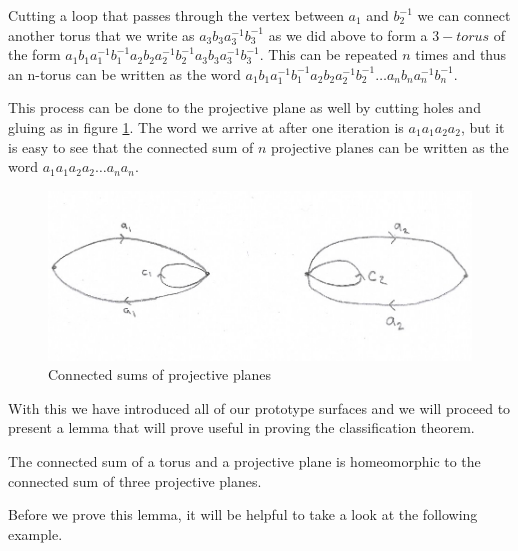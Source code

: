 Cutting a loop that passes through the vertex between $a_1$ and
$b_2^{-1}$ we can connect another torus that we write as
$a_3b_3a_3^{-1}b_3^{-1}$ as we did above to form a $3-torus$ of the
form
$a_1b_1a_1^{-1}b_1^{-1}a_2b_2a_2^{-1}b_2^{-1}a_3b_3a_3^{-1}b_3^{-1}$. This
can be repeated $n$ times and thus an n-torus can be written as the
word $a_1b_1a_1^{-1}b_1^{-1}a_2b_2a_2^{-1}b_2^{-1} \dots
a_nb_na_n^{-1}b_n^{-1}$.

This process can be done to the projective plane as well by cutting
holes and gluing as in figure \ref{fig:2-projective-plane}. The word
we arrive at after one iteration is $a_1a_1a_2a_2$, but it is easy to
see that the connected sum of $n$ projective planes can be written as
the word $a_1a_1a_2a_2 \dots a_na_n$.

\begin{figure}[htbp]
  \centering
  \includegraphics[width=12cm]{2projective.png}
  \caption{Connected sums of projective planes}
  \label{fig:2-projective-plane}
\end{figure}

With this we have introduced all of our prototype surfaces and  we
will proceed to present a lemma that will prove useful in proving the
classification theorem. 

\begin{lem}
  \label{lem:connected}
  The connected sum of a torus and a projective plane is homeomorphic
  to the connected sum of three projective planes. 
\end{lem}

Before we prove this lemma, it will be helpful to take a look at the
following example.

